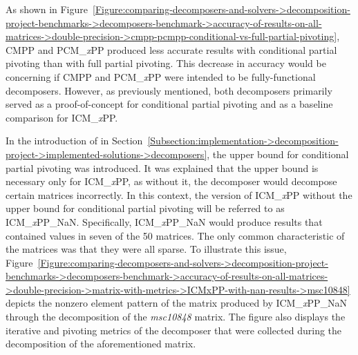 As shown in Figure~\ref{Figure:comparing-decomposers-and-solvers->decomposition-project-benchmarks->decomposers-benchmark->accuracy-of-results-on-all-matrices->double-precision->cmpp-pcmpp-conditional-vs-full-partial-pivoting}, CMPP and PCM\_\textit{x}PP produced less accurate results with conditional partial pivoting than with full partial pivoting.
This decrease in accuracy would be concerning if CMPP and PCM\_\textit{x}PP were intended to be fully-functional decomposers.
However, as previously mentioned, both decomposers primarily served as a proof-of-concept for conditional partial pivoting and as a baseline comparison for ICM\_\textit{x}PP.

\label{Text:comparing-decomposers-and-solvers->decomposition-project-benchmarks->decomposers-benchmark->accuracy-of-results-on-all-matrices->double-precision->ICMxPP-nan-values-explanation-beginning}
In the introduction of  in Section~\ref{Subsection:implementation->decomposition-project->implemented-solutions->decomposers}, the upper bound for conditional partial pivoting was introduced.
It was explained that the upper bound is necessary only for ICM\_\textit{x}PP, as without it, the decomposer would decompose certain matrices incorrectly.
In this context, the version of ICM\_\textit{x}PP without the upper bound for conditional partial pivoting will be referred to as ICM\_\textit{x}PP\_NaN.
Specifically, ICM\_\textit{x}PP\_NaN would produce results that contained  values in seven of the 50 matrices.
The only common characteristic of the matrices was that they were all sparse.
To illustrate this issue, Figure~\ref{Figure:comparing-decomposers-and-solvers->decomposition-project-benchmarks->decomposers-benchmark->accuracy-of-results-on-all-matrices->double-precision->matrix-with-metrics->ICMxPP-with-nan-results->msc10848} depicts the nonzero element pattern of the  matrix produced by ICM\_\textit{x}PP\_NaN through the decomposition of the \textit{msc10848} matrix.
The figure also displays the iterative and pivoting metrics of the decomposer that were collected during the decomposition of the aforementioned matrix.

